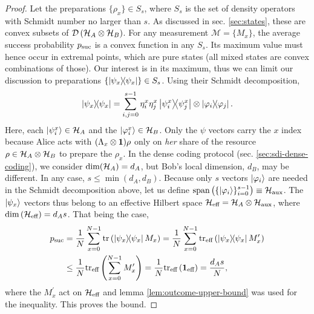    \schmidtnumber*
    \begin{proof}
        Let the preparations $\{ \rho_x \} \in S_s$, where $S_s$ is the set of density operators with Schmidt number no larger than $s$. As discussed in sec. \ref{sec:states}, these are convex subsets of $\mathcal{D}\left( \mathcal{H}_A \otimes \mathcal{H}_B \right)$.  For any measurement $\mathcal{M} = \{ M_x \}$, the average success probability $p_{\text{suc}}$ is a convex function in any $S_s$. Its maximum value must hence occur in extremal points, which are pure states (all mixed states are convex combinations of those). Our interest is in its maximum, thus we can limit our discussion to preparations $\{ \ketbra{\psi_x}{\psi_x} \} \in S_s$. Using their Schmidt decomposition,
        $$
            \ketbra{\psi_x}{\psi_x} = \sum_{i,j = 0}^{s - 1} \eta_i^x \eta_j^x \ketbra{\psi_i^x}{\psi_j^x} \otimes \ketbra{\varphi_i}{\varphi_j} .
            \label{eq:schmidt-decomposition-witness-result}
        $$
        Here, each $\ket{\psi_i^x} \in \mathcal{H}_A$ and the $\ket{\varphi_i^x} \in \mathcal{H}_B$. Only the $\psi$ vectors carry the $x$ index because Alice acts with $(\Lambda_x \otimes \mathbf{1})\rho$ only on \emph{her} share of the resource $\rho \in \mathcal{H}_A \otimes \mathcal{H}_B$ to prepare the $\rho_x$. In the dense coding protocol (sec. \ref{sec:sdi-dense-coding}), we consider $\text{dim}(\mathcal{H}_A) = d_A$, but Bob's local dimension, $d_B$, may be different. In any case, $s \leq \min(d_A, d_B)$. Because only $s$ vectors $\ket{\varphi_i}$ are needed in the Schmidt decomposition above, let us define $\text{span} \left( \{ \ket{\varphi_i} \}_{i=0}^{s-1} \right) \equiv \mathcal{H}_{\text{aux}}$. The $\ket{\psi_x}$ vectors thus belong to an effective Hilbert space $\mathcal{H}_{\text{eff}} = \mathcal{H}_A \otimes \mathcal{H}_{\text{aux}}$, where $\text{dim} \left( \mathcal{H}_{\text{eff}} \right) = d_A s$. That being the case,
        \begin{align*}
            p_{\text{suc}} &= \frac{1}{N} \sum_{x=0}^{N-1} \text{tr}\left(  \ketbra{\psi_x}{\psi_x} M_x  \right) 
                  = \frac{1}{N} \sum_{x=0}^{N-1} \text{tr}_{\text{eff}}\left(  \ketbra{\psi_x}{\psi_x} M_x^\prime  \right) \\
                  &\leq \frac{1}{N} \text{tr}_{\text{eff}}\left(  \sum_{x=0}^{N-1} M_x^\prime  \right)
                  = \frac{1}{N} \text{tr}_{\text{eff}}\left(  \mathbf{1}_{\text{eff}}  \right)
                  = \frac{d_A s}{N} ,
        \end{align*}
        where the $M_x^\prime$ act on $\mathcal{H}_{\text{eff}}$ and lemma \ref{lem:outcome-upper-bound} was used for the inequality. This proves the bound.


\end{proof}
